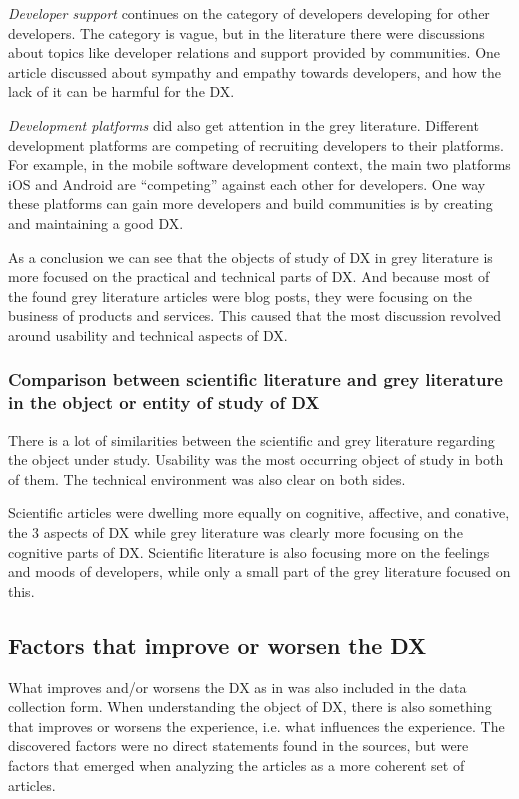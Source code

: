 \documentclass[english, 12pt, a4paper, sci, utf8, a-1b, online]{aaltothesis}
\begin{document}
\textit{Developer support} continues on the category of developers developing for other developers. The category is vague, but in the literature there were discussions about topics like developer relations and support provided by communities. One article discussed about sympathy and empathy towards developers, and how the lack of it can be harmful for the DX.

\textit{Development platforms} did also get attention in the grey literature. Different development platforms are competing of recruiting developers to their platforms. For example, in the mobile software development context, the main two platforms iOS and Android are ``competing'' against each other for developers. One way these platforms can gain more developers and build communities is by creating and maintaining a good DX.

As a conclusion we can see that the objects of study of DX in grey literature is more focused on the practical and technical parts of DX. And because most of the found grey literature articles were blog posts, they were focusing on the business of products and services. This caused that the most discussion revolved around usability and technical aspects of DX.

\subsubsection{Comparison between scientific literature and grey literature in the object or entity of study of DX}

There is a lot of similarities between the scientific and grey literature regarding the object under study. Usability was the most occurring object of study in both of them. The technical environment was also clear on both sides.

Scientific articles were dwelling more equally on cognitive, affective, and conative, the 3 aspects of DX while grey literature was clearly more focusing on the cognitive parts of DX. Scientific literature is also focusing more on the feelings and moods of developers, while only a small part of the grey literature focused on this.

\subsection{Factors that improve or worsen the DX}

What improves and/or worsens the DX as in \textcite{fagerholm-doctoral-thesis} was also included in the data collection form. When understanding the object of DX, there is also something that improves or worsens the experience, i.e. what influences the experience. The discovered factors were no direct statements found in the sources, but were factors that emerged when analyzing the articles as a more coherent set of articles.
\end{document}
